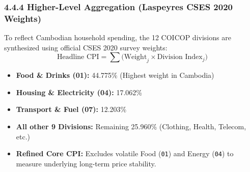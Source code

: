 \documentclass[10pt,a4paper]{article}
\begin{document}
\subsubsection*{4.4.4 Higher-Level Aggregation (Laspeyres CSES 2020 Weights)}
\noindent
To reflect Cambodian household spending, the 12 COICOP divisions are synthesized using official CSES 2020 survey weights:
\begin{equation*}
    \text{Headline CPI} = \sum \Big( \text{Weight}_j \times \text{Division Index}_j \Big)
\end{equation*}
\begin{itemize}[noitemsep,topsep=1pt,leftmargin=*]
    \item \textbf{Food \& Drinks (01):} 44.775\% (Highest weight in Cambodia)
    \item \textbf{Housing \& Electricity (04):} 17.062\%
    \item \textbf{Transport \& Fuel (07):} 12.203\%
    \item \textbf{All other 9 Divisions:} Remaining 25.960\% (Clothing, Health, Telecom, etc.)
    \item \textbf{Refined Core CPI:} Excludes volatile Food (\texttt{01}) and Energy (\texttt{04}) to measure underlying long-term price stability.
\end{itemize}
\end{document}
